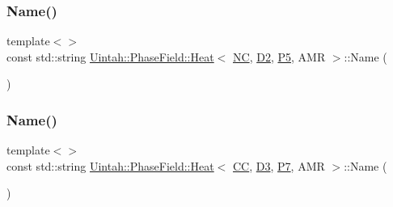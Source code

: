 \mbox{\label{classUintah_1_1PhaseField_1_1Heat_a8f6c6b9bf9e87ad27b76232b415635ff}} 
\subsubsection{\texorpdfstring{Name()}{Name()}\hspace{0.1cm}{\footnotesize\ttfamily [6/8]}}
{\footnotesize\ttfamily template$<$$>$ \\
const std\+::string \hyperlink{classUintah_1_1PhaseField_1_1Heat}{Uintah\+::\+Phase\+Field\+::\+Heat}$<$ \hyperlink{namespaceUintah_1_1PhaseField_a33d355affda78a83f45755ba8388cedda77924170fe82bfd58b74ca3e44139718}{NC}, \hyperlink{namespaceUintah_1_1PhaseField_a12bfc68444894dffdf0cb8d9cf0cc76aa1a451dae278b0103a94105c8776e9a67}{D2}, \hyperlink{namespaceUintah_1_1PhaseField_a24d833a720598df1020f5cc2e75f8702a218e7fca21085b602c79158a04bc83a0}{P5}, A\+MR $>$\+::Name (\begin{DoxyParamCaption}{ }\end{DoxyParamCaption})}

\mbox{\label{classUintah_1_1PhaseField_1_1Heat_a0d9863c94a0326eec3640b49cdb1fbf8}} 
\subsubsection{\texorpdfstring{Name()}{Name()}\hspace{0.1cm}{\footnotesize\ttfamily [7/8]}}
{\footnotesize\ttfamily template$<$$>$ \\
const std\+::string \hyperlink{classUintah_1_1PhaseField_1_1Heat}{Uintah\+::\+Phase\+Field\+::\+Heat}$<$ \hyperlink{namespaceUintah_1_1PhaseField_a33d355affda78a83f45755ba8388cedda22303704507d024d1d6508ed9859a85a}{CC}, \hyperlink{namespaceUintah_1_1PhaseField_a12bfc68444894dffdf0cb8d9cf0cc76aa72fd61934c7ca788c49ad90629f76e78}{D3}, \hyperlink{namespaceUintah_1_1PhaseField_a24d833a720598df1020f5cc2e75f8702a099a5b9a00f5644bb917fdec6afd8768}{P7}, A\+MR $>$\+::Name (\begin{DoxyParamCaption}{ }\end{DoxyParamCaption})}

